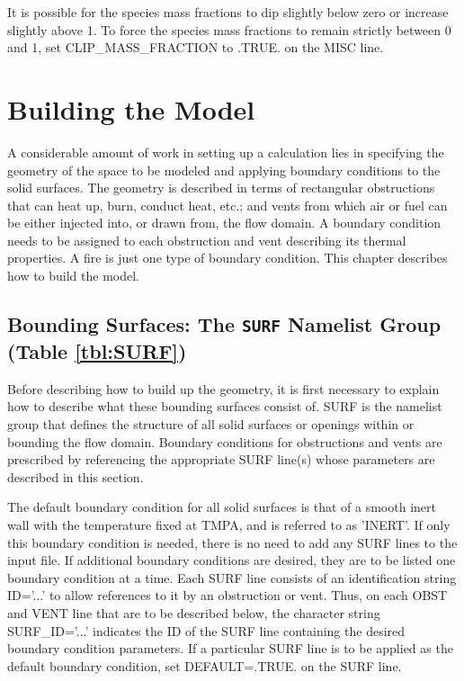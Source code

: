 \documentclass[11pt]{book}
\begin{document}
It is possible for the species mass fractions to dip slightly below zero or increase slightly above 1. To force the species mass fractions to remain strictly between 0 and 1, set {\ct CLIP\_MASS\_FRACTION} to {\ct .TRUE.} on the {\ct MISC} line.








\chapter{Building the Model}

A considerable amount of work in setting up a calculation lies in specifying the
geometry of the space to be modeled and applying boundary conditions
to the solid surfaces. The geometry is described in terms
of rectangular obstructions that can heat up, burn, conduct heat, etc.;
and vents from which air or fuel can be
either injected into, or drawn from, the flow domain.
A boundary condition needs to be assigned to each obstruction
and vent describing its thermal properties. A fire is just one type of
boundary condition. This chapter describes how to build the model.


\section{Bounding Surfaces: The \texorpdfstring{{\tt SURF}}{SURF} Namelist Group (Table \ref{tbl:SURF})}
\label{info:SURF}

Before describing how to build up the geometry, it is first necessary to explain how to describe what these bounding surfaces
consist of. {\ct SURF} is the namelist group that defines
the structure of all solid surfaces or openings within or
bounding the flow domain. Boundary conditions for obstructions and vents are
prescribed by referencing the appropriate {\ct SURF} line(s) whose
parameters are described in this section.

The default boundary condition for all solid surfaces is that of a smooth
inert wall with the temperature fixed at {\ct TMPA}, and is referred to as {\ct 'INERT'}. If only this
boundary condition is needed, there is no need to add any {\ct SURF} lines
to the input file. If additional boundary conditions are desired,
they are to be listed one boundary condition at a time.
Each {\ct SURF} line consists of an identification string {\ct ID='...'} to
allow references to it by an obstruction or vent. Thus, on each
{\ct OBST} and {\ct VENT} line that are to be described below, the character string {\ct SURF\_ID='...'}
indicates the {\ct ID} of the {\ct SURF} line containing the desired boundary
condition parameters. If a particular {\ct SURF} line is to be applied
as the default boundary condition,
set {\ct DEFAULT=.TRUE.} on the {\ct SURF} line.
\end{document}
